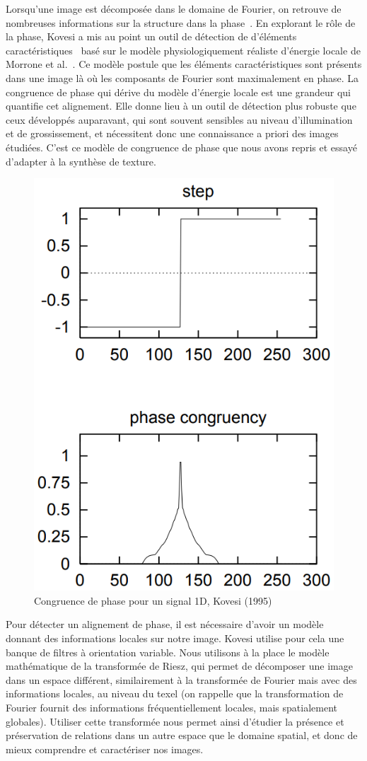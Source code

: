 \bigskip

Lorsqu'une image est décomposée dans le domaine de Fourier, on retrouve de nombreuses informations sur la structure dans la phase~\cite{oppenheim_importance_1981}. En explorant le rôle de la phase, Kovesi a mis au point un outil de détection de d'éléments caractéristiques~\cite{kovesi_image_1995} basé sur le modèle physiologiquement réaliste d'énergie locale de Morrone et al.~\cite{morrone_feature_1987, morrone_feature_1988}. Ce modèle postule que les éléments caractéristiques sont présents dans une image là où les composants de Fourier sont maximalement en phase. La congruence de phase qui dérive du modèle d'énergie locale est une grandeur qui quantifie cet alignement. Elle donne lieu à un outil de détection plus robuste que ceux développés auparavant, qui sont souvent sensibles au niveau d'illumination et de grossissement, et nécessitent donc une connaissance a priori des images étudiées. C'est ce modèle de congruence de phase que nous avons repris et essayé d'adapter à la synthèse de texture.

\begin{figure}[h]
    \centering
    \includegraphics[width=.35\linewidth]{contenu/resources/images/pc_1d_kovesi}
    \caption[Congruence de phase pour un signal 1D]{Congruence de phase pour un signal 1D, Kovesi (1995)~\cite{kovesi_image_1995}}
    \label{fig:pc_1d_kovesi}
\end{figure}

Pour détecter un alignement de phase, il est nécessaire d'avoir un modèle donnant des informations locales sur notre image. Kovesi utilise pour cela une banque de filtres à orientation variable. Nous utilisons à la place le modèle mathématique de la transformée de Riesz, qui permet de décomposer une image dans un espace différent, similairement à la transformée de Fourier mais avec des informations locales, au niveau du texel (on rappelle que la transformation de Fourier fournit des informations fréquentiellement locales, mais spatialement globales). Utiliser cette transformée nous permet ainsi d'étudier la présence et préservation de relations dans un autre espace que le domaine spatial, et donc de mieux comprendre et caractériser nos images.

